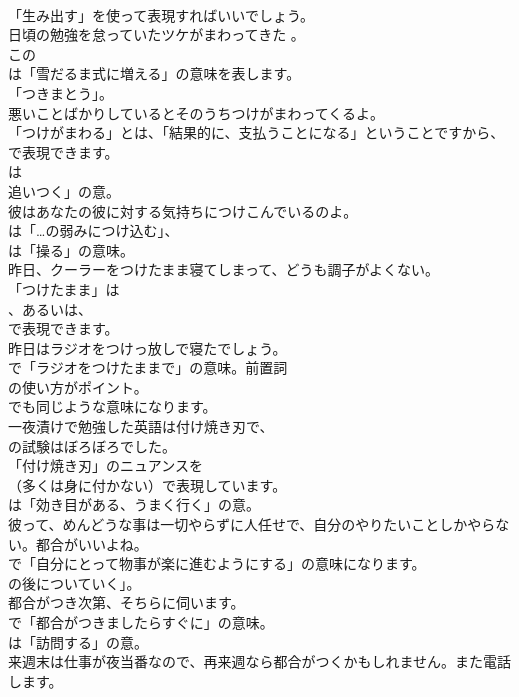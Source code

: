 \documentclass[8pt]{extreport}
\begin{document}
\begin{CJK}{UTF8}{min}
\\	「生み出す」を使って表現すればいいでしょう。	
\\	日頃の勉強を怠っていたツケがまわってきた 。 
\\	この
\\	は「雪だるま式に増える」の意味を表します。
\\	「つきまとう」。	
\\	悪いことばかりしているとそのうちつけがまわってくるよ。 
\\	「つけがまわる」とは、「結果的に、支払うことになる」ということですから、
\\	で表現できます。
\\	は
\\	追いつく」の意。	
\\	彼はあなたの彼に対する気持ちにつけこんでいるのよ。 
\\	は「…の弱みにつけ込む」、
\\	は「操る」の意味。	
\\	昨日、クーラーをつけたまま寝てしまって、どうも調子がよくない。 
\\	「つけたまま」は
\\	、あるいは、
\\	で表現できます。	
\\	昨日はラジオをつけっ放しで寝たでしょう。 
\\	で「ラジオをつけたままで」の意味。前置詞
\\	の使い方がポイント。
\\	でも同じような意味になります。	
\\	一夜漬けで勉強した英語は付け焼き刃で、
\\	の試験はぼろぼろでした。 
\\	「付け焼き刃」のニュアンスを 
\\	（多くは身に付かない）で表現しています。
\\	は「効き目がある、うまく行く」の意。	
\\	彼って、めんどうな事は一切やらずに人任せで、自分のやりたいことしかやらない。都合がいいよね。 
\\	で「自分にとって物事が楽に進むようにする」の意味になります。
\\	の後についていく」。	
\\	都合がつき次第、そちらに伺います。 
\\	で「都合がつきましたらすぐに」の意味。
\\	は「訪問する」の意。	
\\	来週末は仕事が夜当番なので、再来週なら都合がつくかもしれません。また電話します。 

\end{CJK}
\end{document}
